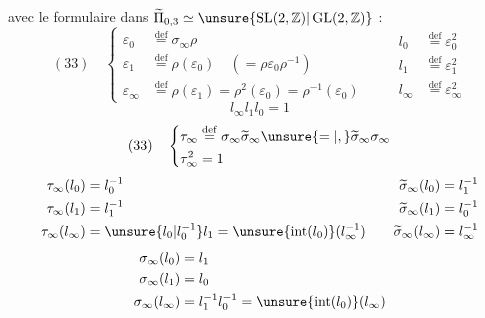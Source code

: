avec le formulaire  dans $\widetilde\Pi_{0,3}\simeq\unsure{\operatorname{SL}(2,\mathbb Z)|\operatorname{GL}(2,\mathbb Z)}$ :
\[
(33)\quad\left\{\begin{aligned}
\varepsilon_0&\overset{\mathrm{def}}=\sigma_\infty\rho\\
\varepsilon_1&\overset{\mathrm{def}}=\rho(\varepsilon_0)\quad(=\rho\varepsilon_0\rho^{-1})\\
\varepsilon_\infty&\overset{\mathrm{def}}=\rho(\varepsilon_1)=\rho^2(\varepsilon_0)=\rho^{-1}(\varepsilon_0)
\end{aligned}\right.
\qquad
\begin{aligned}
l_0&\overset{\mathrm{def}}=\varepsilon_0^2\\
l_1&\overset{\mathrm{def}}=\varepsilon_1^2\\
l_\infty&\overset{\mathrm{def}}=\varepsilon_\infty^2
\end{aligned}
\]
\[
l_\infty l_1l_0=1
\]
\[
(33)\quad\left\{\begin{aligned}
\tau_\infty&\overset{\mathrm{def}}=\sigma_\infty\widetilde\sigma_\infty\unsure{=|,}\widetilde\sigma_\infty\sigma_\infty\\
\tau_\infty^2&=1
\end{aligned}\right.
\]
\[
\begin{aligned}
\tau_\infty(l_0)&=l_0^{-1}\\
\tau_\infty(l_1)&=l_1^{-1}\\
\tau_\infty(l_\infty)&=\unsure{l_0|l_0^{-1}}l_1=\unsure{\operatorname{int}(l_0)}(l_\infty^{-1})
\end{aligned}
\qquad
\begin{aligned}
\widetilde\sigma_\infty(l_0)&=l_1^{-1}\\
\widetilde\sigma_\infty(l_1)&=l_0^{-1}\\
\widetilde\sigma_\infty(l_\infty)&=l_\infty^{-1}
\end{aligned}
\]
\[
\begin{aligned}
\sigma_\infty(l_0)&=l_1\\
\sigma_\infty(l_1)&=l_0\\
\sigma_\infty(l_\infty)&=l_1^{-1}l_0^{-1}=\unsure{\operatorname{int}(l_0)}(l_\infty)
\end{aligned}
\]
